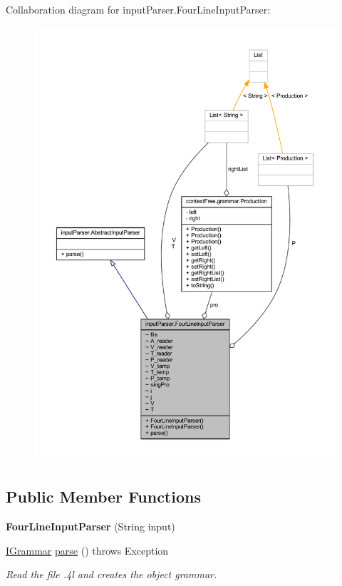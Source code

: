 Collaboration diagram for input\-Parser.\-Four\-Line\-Input\-Parser\-:\nopagebreak
\begin{figure}[H]
\begin{center}
\leavevmode
\includegraphics[width=350pt]{classinput_parser_1_1_four_line_input_parser__coll__graph}
\end{center}
\end{figure}
\subsection*{Public Member Functions}
\begin{DoxyCompactItemize}
\item 
\hypertarget{classinput_parser_1_1_four_line_input_parser_ab60c07b777f5edc493d0d71abcfdc840}{{\bfseries Four\-Line\-Input\-Parser} (String input)}\label{classinput_parser_1_1_four_line_input_parser_ab60c07b777f5edc493d0d71abcfdc840}

\item 
\hyperlink{interfacecontext_free_1_1grammar_1_1_i_grammar}{I\-Grammar} \hyperlink{classinput_parser_1_1_four_line_input_parser_a99c37488d66cfeecb33e13d573b4a81a}{parse} ()  throws Exception
\begin{DoxyCompactList}\small\item\em Read the file .4l and creates the object grammar. \end{DoxyCompactList}\end{DoxyCompactItemize}
